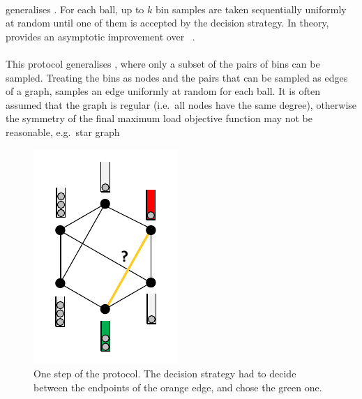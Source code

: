 \paragraph{\KThinning}

\KThinning generalises \TwoThinning. For each ball, up to $k$ bin samples are taken sequentially uniformly at random until one of them is accepted by the decision strategy. In theory, \KThinning provides an asymptotic improvement over \TwoThinning~\cite{feldheim2020dthinning, los2021quantilethreshold}.


\paragraph{\GraphicalTwoChoice}
This protocol generalises \TwoChoice, where only a subset of the pairs of bins can be sampled. Treating the bins as nodes and the pairs that can be sampled as edges of a graph, \GraphicalTwoChoice samples an edge uniformly at random for each ball. It is often assumed that the graph is regular (i.e.\ all nodes have the same degree), otherwise the symmetry of the final maximum load objective function may not be reasonable, e.g.\ star graph

\begin{figure}[hbt!] \label{graphical-two-choice-intro}
    \centering
    \includegraphics[scale=1.5]{Chapter2/Figs/graphical_two_choice_intro.pdf}
    \caption{One step of the \GraphicalTwoChoice protocol. The decision strategy had to decide between the endpoints of the orange edge, and chose the green one.}
\end{figure}

